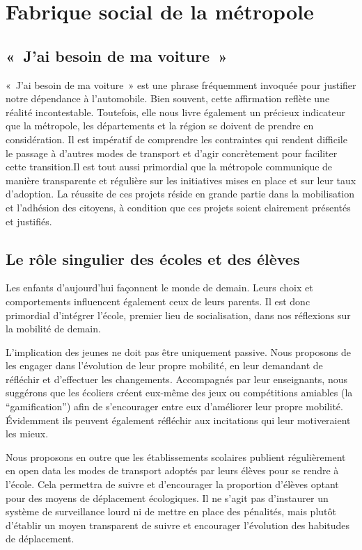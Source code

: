 \chapter{Fabrique social de la métropole}


\section{«~J'ai besoin de ma voiture~»}

«~J'ai besoin de ma voiture~» est une phrase fréquemment invoquée pour
justifier notre dépendance à l'automobile. Bien souvent, cette
affirmation reflète une réalité incontestable. Toutefois, elle nous
livre également un précieux indicateur que la métropole, les
départements et la région se doivent de prendre en considération. Il
est impératif de comprendre les contraintes qui rendent difficile le
passage à d'autres modes de transport et d'agir concrètement pour
faciliter cette transition.Il est tout aussi primordial que la
métropole communique de manière transparente et régulière sur les
initiatives mises en place et sur leur taux d'adoption. La réussite de
ces projets réside en grande partie dans la mobilisation et l'adhésion
des citoyens, à condition que ces projets soient clairement présentés
et justifiés.


\section{Le rôle singulier des écoles et des élèves}

Les enfants d'aujourd'hui façonnent le monde de demain. Leurs choix et
comportements influencent également ceux de leurs parents. Il est donc
primordial d'intégrer l'école, premier lieu de socialisation, dans nos
réflexions sur la mobilité de demain.

L'implication des jeunes ne doit pas être uniquement passive.  Nous
proposons de les engager dans l'évolution de leur propre mobilité, en
leur demandant de réfléchir et d'effectuer les changements.
Accompagnés par leur enseignants, nous suggérons que les écoliers
créent eux-même des jeux ou compétitions amiables (la
``gamification'') afin de s'encourager entre eux d'améliorer leur
propre mobilité.  Évidemment ils peuvent également réfléchir aux
incitations qui leur motiveraient les mieux.

Nous proposons en outre que les établissements scolaires publient
régulièrement en open data les modes de transport adoptés par leurs
élèves pour se rendre à l'école. Cela permettra de suivre et
d'encourager la proportion d'élèves optant pour des moyens de
déplacement écologiques.  Il ne s'agit pas d'instaurer un système de
surveillance lourd ni de mettre en place des pénalités, mais plutôt
d'établir un moyen transparent de suivre et encourager l'évolution des
habitudes de déplacement.

